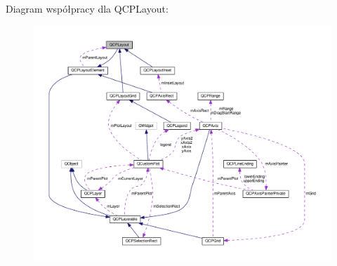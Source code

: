 Diagram współpracy dla Q\+C\+P\+Layout\+:\nopagebreak
\begin{figure}[H]
\begin{center}
\leavevmode
\includegraphics[width=350pt]{class_q_c_p_layout__coll__graph}
\end{center}
\end{figure}
